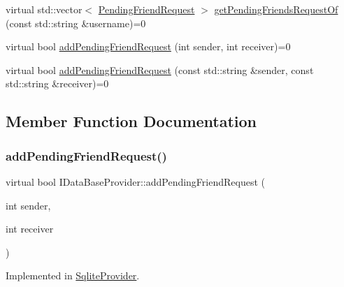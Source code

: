 \begin{DoxyCompactItemize}
virtual std\+::vector$<$ \mbox{\hyperlink{structPendingFriendRequest}{Pending\+Friend\+Request}} $>$ \mbox{\hyperlink{classIDataBaseProvider_a376d53c78f3e101b9c0e4540330cce5b}{get\+Pending\+Friends\+Request\+Of}} (const std\+::string \&username)=0
\item 
virtual bool \mbox{\hyperlink{classIDataBaseProvider_ab8e4c2a8bb221a594947ec6216b80f95}{add\+Pending\+Friend\+Request}} (int sender, int receiver)=0
\item 
virtual bool \mbox{\hyperlink{classIDataBaseProvider_ae41b4c95e8f56e613e5e37b3563ef1f0}{add\+Pending\+Friend\+Request}} (const std\+::string \&sender, const std\+::string \&receiver)=0
\end{DoxyCompactItemize}


\subsection{Member Function Documentation}
\mbox{\label{classIDataBaseProvider_ab8e4c2a8bb221a594947ec6216b80f95}} 
\subsubsection{\texorpdfstring{add\+Pending\+Friend\+Request()}{addPendingFriendRequest()}\hspace{0.1cm}{\footnotesize\ttfamily [1/2]}}
{\footnotesize\ttfamily virtual bool I\+Data\+Base\+Provider\+::add\+Pending\+Friend\+Request (\begin{DoxyParamCaption}\item[{int}]{sender,  }\item[{int}]{receiver }\end{DoxyParamCaption})\hspace{0.3cm}{\ttfamily [pure virtual]}}



Implemented in \mbox{\hyperlink{classSqliteProvider_a085e35f6de7248f7142a8e6841ab3b65}{Sqlite\+Provider}}.

\mbox{\label{classIDataBaseProvider_ae41b4c95e8f56e613e5e37b3563ef1f0}} 
